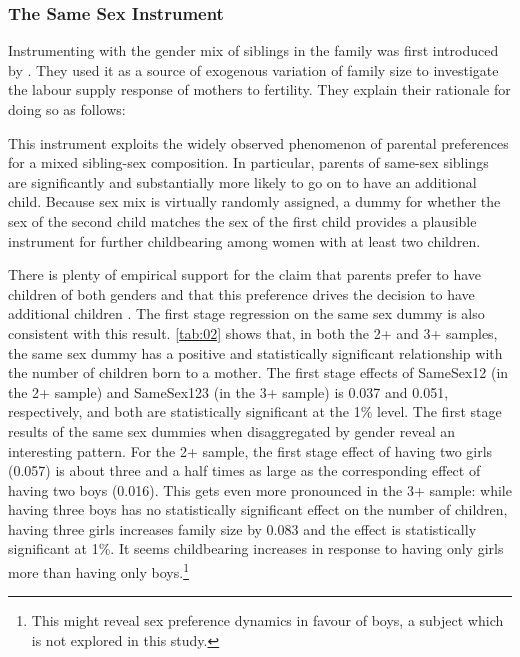 \subsubsection{The Same Sex Instrument}

Instrumenting with the gender mix of siblings in the family was first introduced by \textcite{angrist_children_1998}. They used it as a source of exogenous variation of family size to investigate the labour supply response of mothers to fertility. They explain their rationale for doing so as follows:

\begin{displayquote}
This instrument exploits the widely observed phenomenon of parental preferences for a mixed sibling-sex composition. In particular, parents of same-sex siblings are significantly and substantially more likely to go on to have an additional child. Because sex mix is virtually randomly assigned, a dummy for whether the sex of the second child matches the sex of the first child provides a plausible instrument for further childbearing among women with at least two children. 
\end{displayquote}

There is plenty of empirical support for the claim that parents prefer to have children of both genders and that this preference drives the decision to have additional children \parencite{norling_measuring_2018,bisbee_local_2015}. The first stage regression on the same sex dummy is also consistent with this result. \autoref{tab:02} shows that, in both the 2+ and 3+ samples, the same sex dummy has a positive and statistically significant relationship with the number of children born to a mother.  The first stage effects of SameSex12 (in the 2+ sample) and SameSex123 (in the 3+ sample) is 0.037 and 0.051, respectively, and both are statistically significant at the 1\% level. The first stage results of the same sex dummies when disaggregated by gender reveal an interesting pattern. For the 2+ sample, the first stage effect of having two girls (0.057) is about three and a half times as large as the corresponding effect of having two boys (0.016). This gets even more pronounced in the 3+ sample: while having three boys has no statistically significant effect on the number of children, having three girls increases family size by 0.083 and the effect is statistically significant at 1\%. It seems childbearing increases in response to having only girls more than having only boys.\footnote{ This might reveal sex preference dynamics in favour of boys, a subject which is not explored in this study. } 


